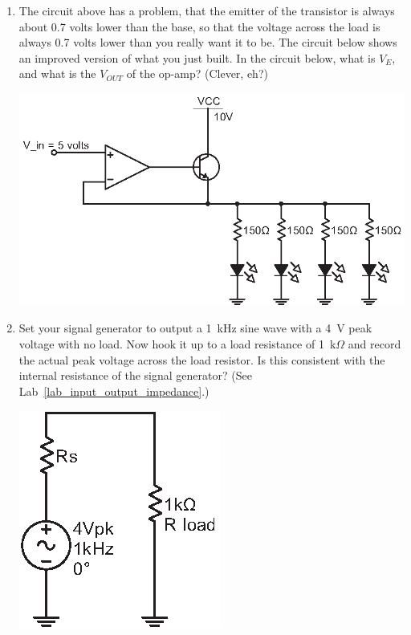 \begin{enumerate}[wide]
\item The circuit above has a problem, that the emitter of the transistor is always about 0.7 volts lower than the base, so that the voltage across the load is always 0.7 volts lower than you really want it to be.  The circuit below shows an improved version of what you just built.  In the circuit below, what is $V_E$, and what is the $V_{OUT}$ of the op-amp?  (Clever, eh?)  
\begin{center}
\includegraphics{bjt/emitter_follower2.eps}
\end{center}

\item Set your signal generator to output a 1~kHz sine wave with a 4~V peak voltage with no load.  Now hook it up to a load resistance of 1~k$\Omega$ and record the actual peak voltage across the load resistor.  Is this consistent with the internal resistance of the signal generator?  (See Lab~\ref{lab_input_output_impedance}.)
 \begin{center}
\includegraphics{bjt/unamplified_ac.eps}
\end{center}


\end{enumerate}
